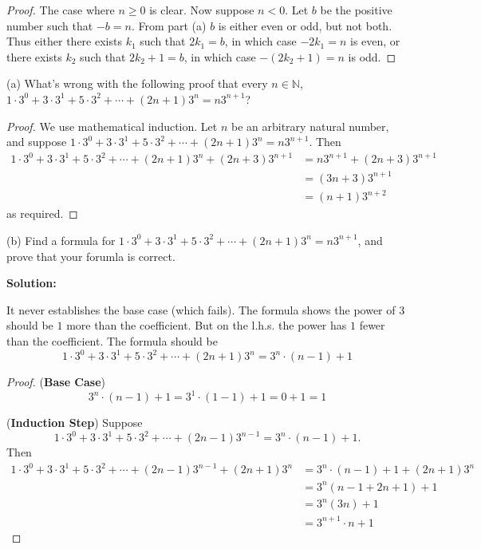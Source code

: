\begin{proof}
    The case where $n \ge 0$ is clear.
    Now suppose $n < 0$.
    Let $b$ be the positive number such that $-b = n$.
    From part (a) $b$ is either even or odd, but not both.
    Thus either there exists $k_1$ such that $2 k_1 = b$,
        in which case $- 2 k_1 = n$ is even,
    or there exists $k_2$ such that $2 k_2 + 1 = b$,
        in which case $- (2 k_2 + 1) = n$ is odd.
\end{proof}

\begin{tcolorbox}[title=Problem 18, breakable]
    (a) What's wrong with the following proof that every $n \in \mathbb{N}$,
        $1 \cdot 3^0 + 3 \cdot 3^1 + 5 \cdot 3^2 + \cdots + (2n + 1)3^n = n 3^{n + 1}$?
    \begin{proof}
        We use mathematical induction. Let $n$ be an arbitrary natural number,
        and suppose $1 \cdot 3^0 + 3 \cdot 3^1 + 5 \cdot 3^2 + \cdots + (2n + 1)3^n = n 3^{n + 1}$.
        Then 
        \begin{align*}
            1 \cdot 3^0 + 3 \cdot 3^1 + 5 \cdot 3^2 + \cdots + (2n + 1)3^n + (2n + 3)3^{n + 1}
            &= n 3^{n + 1} + (2n + 3) 3^{n + 1} \\
            &= (3n + 3) 3^{n + 1} \\
            &= (n + 1)3^{n + 2}
        \end{align*}
        as required.
    \end{proof} 
    (b) Find a formula for $1 \cdot 3^0 + 3 \cdot 3^1 + 5 \cdot 3^2 + \cdots + (2n + 1)3^n = n 3^{n + 1}$, and 
        prove that your forumla is correct.
\end{tcolorbox}

\textbf{Solution:}

It never establishes the base case (which fails).
The formula shows the power of $3$ should be $1$ more than the coefficient.
But on the l.h.s. the power has $1$ fewer than the coefficient.
The formula should be 
\[1 \cdot 3^0 + 3 \cdot 3^1 + 5 \cdot 3^2 + \cdots + (2n + 1)3^n = 3^n \cdot (n - 1) + 1\]

\begin{proof}
    (\textbf{Base Case}) 
    \[
    3^n \cdot (n - 1) + 1 = 3^1 \cdot (1 - 1) + 1 = 0 + 1 = 1
    \]

    (\textbf{Induction Step})  
    Suppose 
    \[
    1 \cdot 3^0 + 3 \cdot 3^1 + 5 \cdot 3^2 + \cdots + (2n - 1)3^{n-1} = 3^n \cdot (n - 1) + 1.
    \]  
    Then 
    \begin{align*}
        1 \cdot 3^0 + 3 \cdot 3^1 + 5 \cdot 3^2 + \cdots + (2n - 1)3^{n-1} + (2n + 1)3^n 
        &= 3^n \cdot (n - 1) + 1 + (2n + 1)3^n \\
        &= 3^n(n - 1 + 2n + 1) + 1 \\
        &= 3^n (3n) + 1 \\
        &= 3^{n+1} \cdot n + 1 
    \end{align*}
\end{proof}

